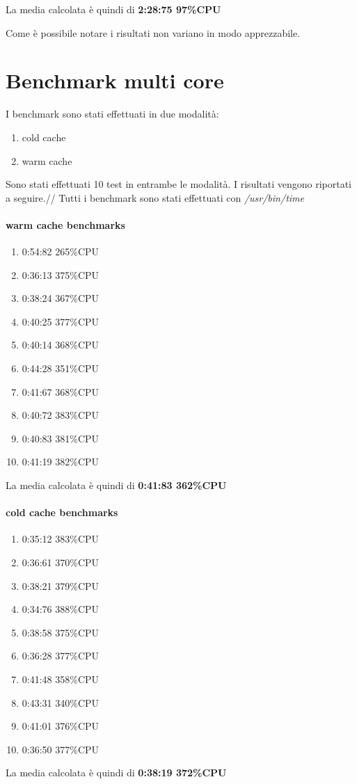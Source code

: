 \documentclass[11pt,a4paper,twoside,openright]{book}
\begin{document}
La media calcolata è quindi di \textbf{2:28:75 97\%CPU}

Come è possibile notare i risultati non variano in modo apprezzabile.


\section{Benchmark multi core}
I benchmark sono stati effettuati in due modalità:
\begin{enumerate}
				\item cold cache
				\item warm cache
\end{enumerate}
Sono stati effettuati 10 test in entrambe le modalità. I risultati vengono riportati a seguire.//
Tutti i benchmark sono stati effettuati con \textit{/usr/bin/time}

\paragraph{warm cache benchmarks}
\begin{enumerate}
				\item 0:54:82 265\%CPU
				\item 0:36:13 375\%CPU
				\item 0:38:24 367\%CPU
				\item 0:40:25 377\%CPU
				\item 0:40:14 368\%CPU
				\item 0:44:28 351\%CPU
				\item 0:41:67 368\%CPU
				\item 0:40:72 383\%CPU
				\item 0:40:83 381\%CPU
				\item 0:41:19 382\%CPU
\end{enumerate}
La media calcolata è quindi di \textbf{0:41:83 362\%CPU}

\paragraph{cold cache benchmarks}
\begin{enumerate}
				\item 0:35:12 383\%CPU
				\item 0:36:61 370\%CPU
				\item 0:38:21 379\%CPU
				\item 0:34:76 388\%CPU
				\item 0:38:58 375\%CPU
				\item 0:36:28 377\%CPU
				\item 0:41:48 358\%CPU
				\item 0:43:31 340\%CPU
				\item 0:41:01 376\%CPU
				\item 0:36:50 377\%CPU
\end{enumerate}
La media calcolata è quindi di \textbf{0:38:19 372\%CPU}
\end{document}
